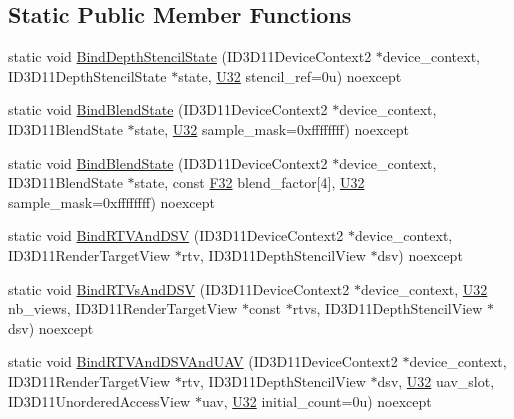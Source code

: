 \subsection*{Static Public Member Functions}
\begin{DoxyCompactItemize}
\item 
static void \hyperlink{structmage_1_1_pipeline_1_1_o_m_aed53ce1ef60ec2a65a49c4fae5e0e735}{Bind\+Depth\+Stencil\+State} (I\+D3\+D11\+Device\+Context2 $\ast$device\+\_\+context, I\+D3\+D11\+Depth\+Stencil\+State $\ast$state, \hyperlink{namespacemage_a41c104c036fba3756a74e19f793eeaa1}{U32} stencil\+\_\+ref=0u) noexcept
\item 
static void \hyperlink{structmage_1_1_pipeline_1_1_o_m_aec21e5addbdbf2542906002a94d42d07}{Bind\+Blend\+State} (I\+D3\+D11\+Device\+Context2 $\ast$device\+\_\+context, I\+D3\+D11\+Blend\+State $\ast$state, \hyperlink{namespacemage_a41c104c036fba3756a74e19f793eeaa1}{U32} sample\+\_\+mask=0xffffffff) noexcept
\item 
static void \hyperlink{structmage_1_1_pipeline_1_1_o_m_adf2ff2106dc8819db15965763e67594b}{Bind\+Blend\+State} (I\+D3\+D11\+Device\+Context2 $\ast$device\+\_\+context, I\+D3\+D11\+Blend\+State $\ast$state, const \hyperlink{namespacemage_aa97e833b45f06d60a0a9c4fc22ae02c0}{F32} blend\+\_\+factor\mbox{[}4\mbox{]}, \hyperlink{namespacemage_a41c104c036fba3756a74e19f793eeaa1}{U32} sample\+\_\+mask=0xffffffff) noexcept
\item 
static void \hyperlink{structmage_1_1_pipeline_1_1_o_m_a0f699cf987aaec62ab9480f6e3367c62}{Bind\+R\+T\+V\+And\+D\+SV} (I\+D3\+D11\+Device\+Context2 $\ast$device\+\_\+context, I\+D3\+D11\+Render\+Target\+View $\ast$rtv, I\+D3\+D11\+Depth\+Stencil\+View $\ast$dsv) noexcept
\item 
static void \hyperlink{structmage_1_1_pipeline_1_1_o_m_aac50fec46e2f8018ad99d04baf7ac417}{Bind\+R\+T\+Vs\+And\+D\+SV} (I\+D3\+D11\+Device\+Context2 $\ast$device\+\_\+context, \hyperlink{namespacemage_a41c104c036fba3756a74e19f793eeaa1}{U32} nb\+\_\+views, I\+D3\+D11\+Render\+Target\+View $\ast$const $\ast$rtvs, I\+D3\+D11\+Depth\+Stencil\+View $\ast$dsv) noexcept
\item 
static void \hyperlink{structmage_1_1_pipeline_1_1_o_m_a77bb2107410d56ca4d8c74e01cbc6fd3}{Bind\+R\+T\+V\+And\+D\+S\+V\+And\+U\+AV} (I\+D3\+D11\+Device\+Context2 $\ast$device\+\_\+context, I\+D3\+D11\+Render\+Target\+View $\ast$rtv, I\+D3\+D11\+Depth\+Stencil\+View $\ast$dsv, \hyperlink{namespacemage_a41c104c036fba3756a74e19f793eeaa1}{U32} uav\+\_\+slot, I\+D3\+D11\+Unordered\+Access\+View $\ast$uav, \hyperlink{namespacemage_a41c104c036fba3756a74e19f793eeaa1}{U32} initial\+\_\+count=0u) noexcept

\end{DoxyCompactItemize}

